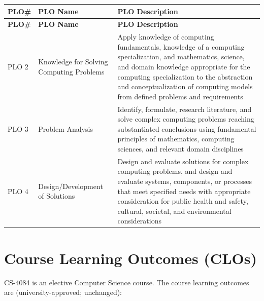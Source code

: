 \documentclass{article}
\begin{document}
\renewcommand{\arraystretch}{1.4}
\begin{longtable}{|l|p{3.3cm}|p{10.3cm}|}
\hline
\textbf{PLO\#}  & \textbf{PLO Name} & \textbf{PLO Description} \\ \hline
\endfirsthead
\hline
\textbf{PLO\#}  & \textbf{PLO Name} & \textbf{PLO Description} \\ \hline
\endhead
PLO 2 & Knowledge for Solving Computing Problems &
Apply knowledge of computing fundamentals, knowledge of a computing specialization, and mathematics, science, and domain knowledge appropriate for the computing specialization to the abstraction and conceptualization of computing models from defined problems and requirements \\ \hline
PLO 3 & Problem Analysis & Identify, formulate, research literature, and solve complex computing problems reaching substantiated conclusions using fundamental principles of mathematics, computing sciences, and relevant domain disciplines \\ \hline
PLO 4 & Design/Development of Solutions & Design and evaluate solutions for complex computing problems, and design and evaluate systems, components, or processes that meet specified needs with appropriate consideration for public health and safety, cultural, societal, and environmental considerations \\ \hline
\end{longtable}

\section*{Course Learning Outcomes (CLOs)}
CS-4084 is an elective Computer Science course. The course learning outcomes are (university-approved; unchanged):
\end{document}
